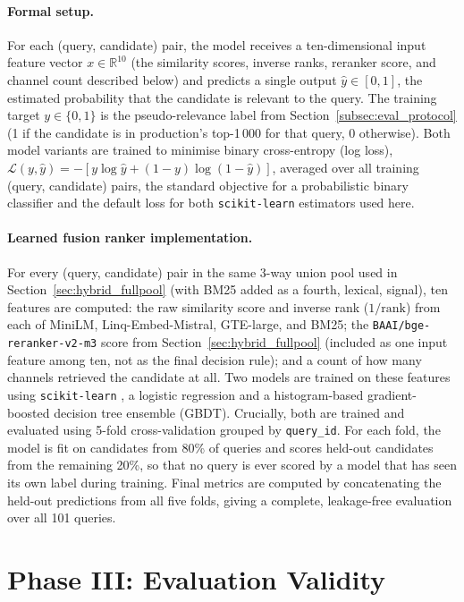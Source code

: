 \documentclass[a4paper,oneside,bibliography=totoc]{scrbook}
\begin{document}
\paragraph{Formal setup.} For each (query, candidate) pair, the model receives a ten-dimensional input feature vector $x \in \mathbb{R}^{10}$ (the similarity scores, inverse ranks, reranker score, and channel count described below) and predicts a single output $\hat{y} \in [0, 1]$, the estimated probability that the candidate is relevant to the query. The training target $y \in \{0, 1\}$ is the pseudo-relevance label from Section~\ref{subsec:eval_protocol} (1 if the candidate is in production's top-1\,000 for that query, 0 otherwise). Both model variants are trained to minimise binary cross-entropy (log loss), $\mathcal{L}(y, \hat{y}) = -\left[y \log \hat{y} + (1 - y) \log (1 - \hat{y})\right]$, averaged over all training (query, candidate) pairs, the standard objective for a probabilistic binary classifier and the default loss for both \texttt{scikit-learn} estimators used here.

\paragraph{Learned fusion ranker implementation.} For every (query, candidate) pair in the same 3-way union pool used in Section~\ref{sec:hybrid_fullpool} (with BM25 added as a fourth, lexical, signal), ten features are computed: the raw similarity score and inverse rank ($1/\text{rank}$) from each of MiniLM, Linq-Embed-Mistral, GTE-large, and BM25; the \texttt{BAAI/bge-reranker-v2-m3} score from Section~\ref{sec:hybrid_fullpool} (included as one input feature among ten, not as the final decision rule); and a count of how many channels retrieved the candidate at all. Two models are trained on these features using \texttt{scikit-learn} \citep{pedregosa2011scikit}, a logistic regression and a histogram-based gradient-boosted decision tree ensemble (GBDT). Crucially, both are trained and evaluated using 5-fold cross-validation grouped by \texttt{query\_id}. For each fold, the model is fit on candidates from 80\% of queries and scores held-out candidates from the remaining 20\%, so that no query is ever scored by a model that has seen its own label during training. Final metrics are computed by concatenating the held-out predictions from all five folds, giving a complete, leakage-free evaluation over all 101 queries.

\section{Phase III: Evaluation Validity}
\label{sec:phase3_method}
\end{document}
